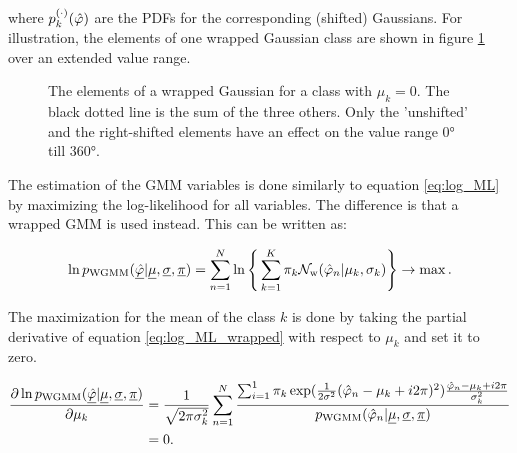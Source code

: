 where $p^{(\cdot)}_k(\hat{\varphi})$ are the \acp{PDF} for the corresponding (shifted) Gaussians. For illustration, the elements of one wrapped Gaussian class are shown in figure \ref{fig:wrapped_gaussians} over an extended value range.

\begin{figure}[!ht]
	\centering
    \def\svgwidth{1\linewidth}
    \scriptsize
	\caption{The elements of a wrapped Gaussian for a class with $\mu_k=0$. The black dotted line is the sum of the three others. Only the 'unshifted' and the right-shifted elements have an effect on the value range $\ang{0}$ till $\ang{360}$.}
	\label{fig:wrapped_gaussians}
\end{figure}



The estimation of the \ac{GMM} variables is done similarly to equation \ref{eq:log_ML} by maximizing the log-likelihood for all variables. The difference is that a wrapped \ac{GMM} is used instead. This can be written as:

\begin{equation}
\ln p_\text{WGMM}(\underline{\hat{\varphi}} |\underline{\mu}, \underline{\sigma}, \underline{\pi}) = \sum^{N}_{n=1}\ln\Bigg\{\sum^K_{k=1}\pi_k\mathcal{N}_\text{w}(\hat{\varphi}_n|\mu_k,\sigma_k)\Bigg\} \rightarrow \max.
\label{eq:log_ML_wrapped}
\end{equation}


The maximization for the mean of the class $k$ is done by taking the partial derivative of equation \ref{eq:log_ML_wrapped} with respect to $\mu_k$ and set it to zero.

\begin{equation}
\begin{split}
\frac{\partial\ln p_\text{WGMM}(\underline{\hat{\varphi}} |\underline{\mu}, \underline{\sigma}, \underline{\pi})}{\partial\mu_k}&= \frac{1}{\sqrt{2\pi\sigma^2_k}} \sum^{N}_{n=1} \frac{\sum^1_{i=1}\pi_k\exp(\frac{1}{2\sigma^2}(\hat{\varphi}_n-\mu_k+i2\pi)^2)\frac{\hat{\varphi}_n-\mu_k+i2\pi}{\sigma^2_k}}{p_\text{WGMM}(\hat{\varphi}_n|\underline{\mu}, \underline{\sigma}, \underline{\pi})}\\
&= 0.
\end{split}
\end{equation}

